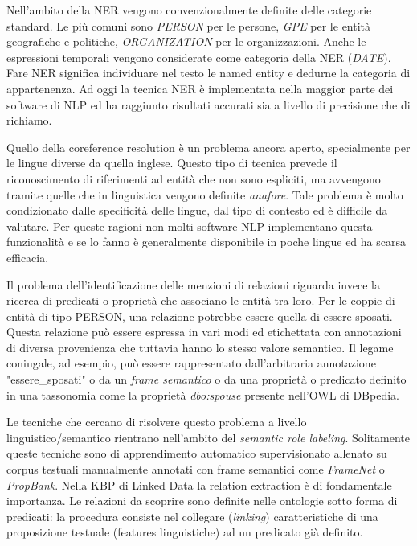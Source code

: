 Nell'ambito della NER vengono convenzionalmente definite delle categorie standard. Le più comuni sono \textit{PERSON} per le persone, \textit{GPE} per le entità geografiche e politiche, \textit{ORGANIZATION} per le organizzazioni. Anche le espressioni temporali vengono considerate come categoria della NER (\textit{DATE}). 
Fare NER significa individuare nel testo le named entity e dedurne la categoria di appartenenza.
Ad oggi la tecnica NER è implementata nella maggior parte dei software di NLP ed ha raggiunto risultati accurati sia a livello di precisione che di richiamo.
 

Quello della coreference resolution è un problema ancora aperto, specialmente per le lingue diverse da quella inglese. Questo tipo di tecnica prevede il riconoscimento di riferimenti ad entità che non sono espliciti, ma avvengono tramite quelle che in linguistica vengono definite \textit{anafore}. Tale problema è molto condizionato dalle specificità delle lingue, dal tipo di contesto ed è difficile da valutare. Per queste ragioni non molti software NLP implementano questa funzionalità e se lo fanno è generalmente disponibile in poche lingue ed ha scarsa efficacia.

Il problema dell'identificazione delle menzioni di relazioni riguarda invece la ricerca di predicati o proprietà che associano le entità tra loro. Per le coppie di entità di tipo PERSON, una relazione potrebbe essere quella di essere sposati. Questa relazione può essere espressa in vari modi ed etichettata con annotazioni di diversa provenienza che tuttavia hanno lo stesso valore semantico. Il legame coniugale, ad esempio, può essere rappresentato dall'arbitraria annotazione "essere\_sposati" o da un \textit{frame semantico} o da una proprietà o predicato definito in una tassonomia come la proprietà \textit{dbo:spouse} presente nell'OWL di DBpedia.

Le tecniche che cercano di risolvere questo problema a livello linguistico/semantico rientrano nell'ambito del \textit{semantic role labeling}.
Solitamente queste tecniche sono di apprendimento automatico supervisionato allenato su corpus testuali manualmente annotati con frame semantici come \textit{FrameNet} \cite{FrameNet} o \textit{PropBank}\cite{Kingsbury2002FromTT}.
Nella KBP di Linked Data la relation extraction è di fondamentale importanza. Le relazioni da scoprire sono definite nelle ontologie sotto forma di predicati: la procedura consiste nel collegare (\textit{linking}) caratteristiche di una proposizione testuale (features linguistiche) ad un predicato già definito.

